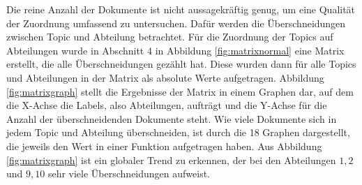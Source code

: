 \documentclass[german,version-2020-11]{uzl-thesis}
\begin{document}
Die reine Anzahl der Dokumente ist nicht aussagekräftig genug, um eine Qualität der Zuordnung umfassend zu untersuchen. Dafür werden die Überschneidungen zwischen Topic und Abteilung betrachtet. Für die Zuordnung der Topics auf Abteilungen wurde in Abschnitt 4 in Abbildung \ref{fig:matrixnormal} eine Matrix erstellt, die alle Überschneidungen gezählt hat. Diese wurden dann für alle Topics und Abteilungen in der Matrix als absolute Werte aufgetragen. Abbildung \ref{fig:matrixgraph} stellt die Ergebnisse der Matrix in einem Graphen dar, auf dem die X-Achse die Labels, also Abteilungen, aufträgt und die Y-Achse für die Anzahl der überschneidenden Dokumente steht. Wie viele Dokumente sich in jedem Topic und Abteilung überschneiden, ist durch die 18 Graphen dargestellt, die jeweils den Wert in einer Funktion aufgetragen haben. Aus Abbildung \ref{fig:matrixgraph} ist ein globaler Trend zu erkennen, der bei den Abteilungen $1,2$ und $9,10$ sehr viele Überschneidungen aufweist. 
\end{document}
